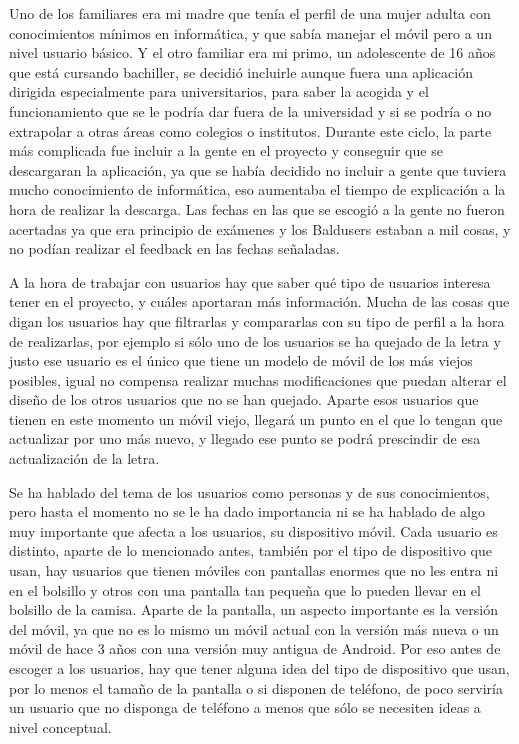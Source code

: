 Uno de los familiares era mi madre que tenía el perfil de una mujer adulta con conocimientos mínimos en informática, y que sabía manejar el móvil pero a un nivel usuario básico.
Y el otro familiar era mi primo, un adolescente de 16 años que está cursando bachiller, se decidió incluirle aunque fuera una aplicación dirigida especialmente para universitarios, para saber la acogida y el funcionamiento que se le podría dar fuera de la universidad y si se podría o no extrapolar a otras áreas como colegios o institutos.
Durante este ciclo, la parte más complicada fue incluir a la gente en el proyecto y conseguir que se descargaran la aplicación, ya que se había decidido no incluir a gente que tuviera mucho conocimiento de informática, eso aumentaba el tiempo de explicación a la hora de realizar la descarga.
Las fechas en las que se escogió a la gente no fueron acertadas ya que era principio de exámenes y los Baldusers estaban a mil cosas, y no podían realizar el feedback en las fechas señaladas.

A la hora de trabajar con usuarios hay que saber qué tipo de usuarios interesa tener en el proyecto, y cuáles aportaran más información.
Mucha de las cosas que digan los usuarios hay que filtrarlas y compararlas con su tipo de perfil a la hora de realizarlas, por ejemplo si sólo uno de los usuarios se ha quejado de la letra y justo ese usuario es el único que tiene un modelo de móvil de los más viejos posibles, igual no compensa realizar muchas modificaciones que puedan alterar el diseño de los otros usuarios que no se han quejado. Aparte esos usuarios que tienen en este momento un móvil viejo, llegará un punto en el que lo tengan que actualizar por uno más nuevo, y llegado ese punto se podrá prescindir de esa actualización de la letra.

Se ha hablado del tema de los usuarios como personas y de sus conocimientos, pero hasta el momento no se le ha dado importancia ni se ha hablado de algo muy importante que afecta a los usuarios, su dispositivo móvil. 
Cada usuario es distinto, aparte de lo mencionado antes, también por el tipo de dispositivo que usan, hay usuarios que tienen móviles con pantallas enormes que no les entra ni en el bolsillo y otros con una pantalla tan pequeña que lo pueden llevar en el bolsillo de la camisa.
Aparte de la pantalla, un aspecto importante es la versión del móvil, ya que no es lo mismo un móvil actual con la versión más nueva o un móvil de hace 3 años con una versión muy antigua de Android.
Por eso antes de escoger a los usuarios, hay que tener alguna idea del tipo de dispositivo que usan, por lo menos el tamaño de la pantalla o si disponen de teléfono, de poco serviría un usuario que no disponga de teléfono a menos que sólo se necesiten ideas a nivel conceptual.




